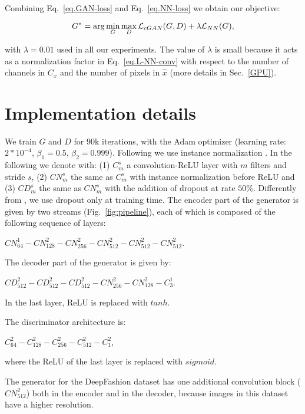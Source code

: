 \documentclass[10pt,twocolumn,letterpaper]{article}
\begin{document}
Combining Eq.~\ref{eq.GAN-loss} and Eq.~\ref{eq.NN-loss} we obtain our  objective:

\begin{equation}
\label{eq.objective}
G^* = \arg \min_G \max_D {\cal L}_{cGAN}(G,D) + \lambda {\cal L}_{NN}(G),
\end{equation}

\noindent
with $\lambda = 0.01$ used
 in all our experiments. The value of $\lambda$ is small because it acts as a normalization factor in  Eq.~\ref{eq.L-NN-conv} with respect to the number of channels in $C_x$ and the number of pixels in  $\hat{x}$ (more details in  Sec.~\ref{GPU}).


\section{Implementation details}
\label{sec:impDetails}
We train $G$ and $D$ for 90k iterations, with the Adam optimizer (learning rate: $2 * 10^{-4}$, $\beta_1 = 0.5$, $\beta_2 =0.999$). Following \cite{pix2pix2016} we use instance normalization \cite{DBLP:journals/corr/UlyanovVL16}. 
In the following we denote with: 
(1) $C_m^s$  a convolution-ReLU layer with $m$ filters and stride $s$,
(2)  $CN_m^s$  the same as $C_m^s$ with instance normalization before ReLU and
(3) $CD_m^s$ the same as $CN_m^s$  with the addition of  dropout at rate $50\%$.
Differently from \cite{pix2pix2016}, we use dropout only at training time.
The encoder part of the generator is given by two streams (Fig.~\ref{fig:pipeline}), each of which is composed of the following sequence of layers:

$CN_{64}^1 - CN_{128}^2 - CN_{256}^2 - CN_{512}^2 - CN_{512}^2 - CN_{512}^2$.

\noindent
The decoder part of the generator is given by:

$CD_{512}^2 - CD_{512}^2 - CD_{512}^2 - CN_{256}^2 - CN_{128}^2 - C_{3}^1$.

\noindent
In the last  layer,  ReLU is replaced with $tanh$.

The discriminator architecture is:

$C_{64}^2 - C_{128}^2 - C_{256}^2 - C_{512}^2 - C_{1}^2$,

\noindent
where the  ReLU of the last  layer  is replaced with $sigmoid$.

The generator for the DeepFashion dataset has one additional convolution block ($CN_{512}^2$)
both in the encoder and in the decoder, because images in this dataset  have a  higher resolution.
\end{document}
